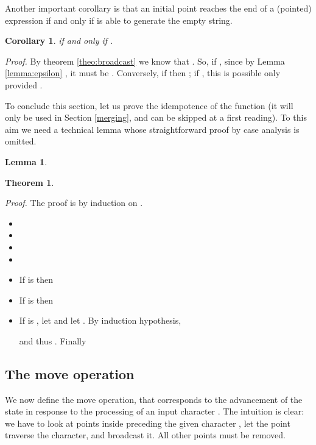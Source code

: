 \documentclass[preprint]{sigplanconf}
\newcounter{item}
\newtheorem{theorem}[item]{Theorem}
\newtheorem{lemma}[item]{Lemma}
\newtheorem{corollary}[item]{Corollary}
\newenvironment{proof}{\begin{trivlist}\item[]{\em Proof.}}{\end{trivlist}}
\begin{document}
Another important corollary is that an initial point reaches 
the end of a (pointed) expression
 if and only if  is able to generate the empty
string.

\begin{corollary}
\label{nullable}
 if and only if
.
\end{corollary}
\begin{proof}
By theorem \ref{theo:broadcast} we know
that . So, if 
, since by Lemma \ref{lemma:epsilon} 
, it must be .
Conversely, if  then ; if
, this is possible only 
provided .
\end{proof}

To conclude this section, let us prove the idempotence
of the  function (it will only be used
in Section \ref{merging}, and can be skipped at a first reading). 
To this aim we need a technical lemma whose straightforward proof by
case analysis is omitted.



\begin{lemma}
~\vspace{-0.45cm}

\end{lemma}






\begin{theorem}\label{bullid}
 ~\quad
\end{theorem}
\begin{proof}
The proof is by induction on .
\begin{itemize}
\item 
\item 
\item 
\item 
\item If  is  then

\item If  is  then

\item If  is , let  and
let .
By induction hypothesis,

and thus . Finally

\end{itemize}
\end{proof}

\subsection{The move operation}
We now define the move operation, that corresponds to the 
advancement of the state in response to the processing of
an input character . The intuition is clear: we have to
look at points inside  preceding the given character ,
let the point traverse the character, and broadcast it. 
All other points must be removed.
\end{document}
